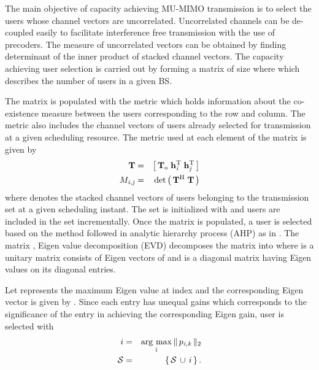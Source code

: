 
The main objective of capacity achieving MU-MIMO transmission is to select the users whose channel vectors are uncorrelated. Uncorrelated channels can be de-coupled easily to facilitate interference free transmission with the use of precoders. The measure of uncorrelated vectors can be obtained by finding determinant of the inner product of stacked  channel vectors. The capacity achieving user selection is carried out by forming a matrix  of size  where  which describes the number of users in a given BS.

The matrix  is populated with the metric which holds information about the co-existence measure between the users corresponding to the  row and  column. The metric also includes the channel vectors of users already selected for transmission at a given scheduling resource. The metric used at each element of the matrix  is given by
\begin{eqnarray}
\mathbf{T} &=& \left [\,\mathbf{T}_{\mathrm{o}} \; \mathbf{h}_{\mathit{i}}^{\mathrm{T}} \; \mathbf{h}_{\mathit{j}}^{\mathrm{T}} \, \right ] \\
{M}_{\mathit{i},\mathit{j}} &=& \det{\left ( \, \mathbf{T}^{\mathrm{H}} \; \mathbf{T} \, \right )} \label{mca1-e1:2}
\label{mca1-e1}
\end{eqnarray}
where  denotes the stacked channel vectors of users belonging to the transmission set  at a given scheduling instant. The set  is initialized with \me{\emptyset} and users are included in the set incrementally. Once the matrix  is populated, a user is selected based on the method followed in analytic hierarchy process (AHP) as in \cite{saaty2008decision}. The matrix , Eigen value decomposition (EVD) decomposes the matrix into  where  is a unitary matrix consists of Eigen vectors of  and  is a diagonal matrix having Eigen values on its diagonal entries.

Let  represents the maximum Eigen value at  index and the corresponding Eigen vector is given by . Since each entry  has unequal gains which corresponds to the significance of the entry in achieving the corresponding Eigen gain, user  is selected with
\begin{eqnarray}
i &=& \operatorname*{\arg\,max}_{\mathrm{i}} \|\, {p}_{\mathit{i},\mathit{k}} \,\|_{2} \label{mca1-e2:1} \\
\mathcal{S} &=& \left \lbrace \, \mathcal{S} \, \cup \, i \, \right \rbrace.
\label{mca1-e2}
\end{eqnarray}

